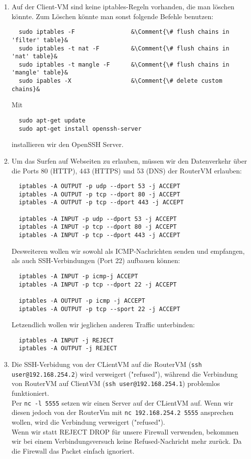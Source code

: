 \documentclass{scrartcl}
\newcommand*{\Comment}[1]{\hfill\makebox[8.0cm][l]{#1}}%
\begin{document}
\begin{enumerate}[\bfseries 1.]
	\item Auf der Client-VM sind keine iptables-Regeln vorhanden, die man
	      löschen könnte. Zum Löschen könnte man sonst folgende Befehle benutzen:

	      \begin{lstlisting}
  sudo iptables -F                &\Comment{\# flush chains in 'filter' table}&
  sudo iptables -t nat -F         &\Comment{\# flush chains in 'nat' table}&
  sudo iptables -t mangle -F      &\Comment{\# flush chains in 'mangle' table}&
  sudo ipables -X                 &\Comment{\# delete custom chains}&
	\end{lstlisting}

	Mit
	\begin{lstlisting}
  sudo apt-get update
  sudo apt-get install openssh-server
	\end{lstlisting}
	installieren wir den OpenSSH Server.

	\item  Um das Surfen auf Webseiten zu erlauben, müssen wir den Datenverkehr über
	      die Ports 80 (HTTP), 443 (HTTPS) und 53 (DNS) der RouterVM erlauben:
	      \begin{lstlisting}
  iptables -A OUTPUT -p udp --dport 53 -j ACCEPT
  iptables -A OUTPUT -p tcp --dport 80 -j ACCEPT
  iptables -A OUTPUT -p tcp --dport 443 -j ACCEPT

  iptables -A INPUT -p udp --dport 53 -j ACCEPT
  iptables -A INPUT -p tcp --dport 80 -j ACCEPT
  iptables -A INPUT -p tcp --dport 443 -j ACCEPT
	\end{lstlisting}
	Desweiteren wollen wir sowohl als ICMP-Nachrichten senden und
	empfangen, als auch SSH-Verbindungen (Port 22) aufbauen können:
	\begin{lstlisting}
  iptables -A INPUT -p icmp-j ACCEPT
  iptables -A INPUT -p tcp --dport 22 -j ACCEPT

  iptables -A OUTPUT -p icmp -j ACCEPT
  iptables -A OUTPUT -p tcp --sport 22 -j ACCEPT
	\end{lstlisting}
	Letzendlich wollen wir jeglichen anderen Traffic unterbinden:
	\begin{lstlisting}
  iptables -A INPUT -j REJECT
  iptables -A OUTPUT -j REJECT
	\end{lstlisting}

	\item
	      Die SSH-Verbidung von der CLientVM auf die RouterVM
	      (\texttt{ssh user@192.168.254.2}) wird verweigert ("refused"),
	      während die Verbindung von RouterVM auf ClientVM
	      (\texttt{ssh user@192.168.254.1}) problemlos funktioniert.\\
	      Per \texttt{nc -l 5555} setzen wir einen Server auf der CLientVM
	      auf. Wenn wir diesen jedoch von der RouterVm mit
	      \texttt{nc 192.168.254.2 5555} ansprechen wollen, wird die
	      Verbindung verweigert ("refused").\\
	      Wenn wir statt REJECT DROP für unsere Firewall verwenden,
	      bekommen wir bei einem Verbindungsversuch keine Refused-Nachricht
	      mehr zurück. Da die Firewall das Packet einfach ignoriert.


\end{enumerate}
\end{document}
